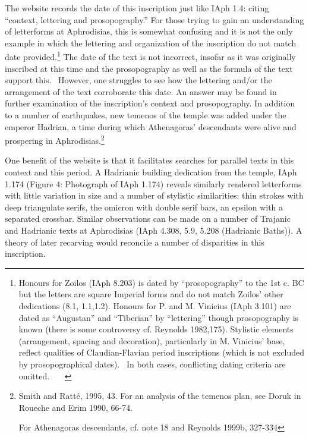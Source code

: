 \documentclass[amsthm,ebook]{saparticle}
\begin{document}
\bigskip

The website records the date of this inscription just like IAph 1.4: citing “context, lettering and prosopography.” For
those trying to gain an understanding of letterforms at Aphrodisias, this is somewhat confusing and it is not the only
example in which the lettering and organization of the inscription do not match date provided.\footnote{ Honours for
Zoilos (IAph 8.203) is dated by “prosopography” to the 1st c. BC but the letters are square Imperial forms and do not
match Zoilos’ other dedications (8.1, 1.1,1.2). Honours for P. and M. Vinicius (IAph 3.101) are dated as “Augustan” and
“Tiberian” by “lettering” though prosopography is known (there is some controversy cf. Reynolds 1982,175). Stylistic
elements (arrangement, spacing and decoration), particularly in M. Vinicius’ base, reflect qualities of
Claudian-Flavian period inscriptions (which is not excluded by prosopographical dates). \ In both cases, conflicting
dating criteria are omitted. \ \ \ } The date of the text is not incorrect, insofar as it was originally inscribed at
this time and the prosopography as well as the formula of the text support this. \ However, one struggles to see how
the lettering and/or the arrangement of the text corroborate this date. An answer may be found in further examination
of the inscription’s context and prosopography. In addition to a number of earthquakes, new temenos of the temple was
added under the emperor Hadrian, a time during which Athenagoras’ descendants were alive and prospering in
Aphrodisias.\footnote{ Smith and Ratté, 1995, 43. For an analysis of the temenos plan, see Doruk in Roueche and Erim
1990, 66-74. \par For Athenagoras descendants, cf. note 18 and Reynolds 1999b, 327-334} \ 


\bigskip

One benefit of the website is that it facilitates searches for parallel texts in this context and this period. A
Hadrianic building dedication from the temple, IAph 1.174 (Figure 4: Photograph of IAph 1.174) reveals similarly
rendered letterforms with little variation in size and a number of stylistic similarities: thin strokes with deep
triangulate serifs, the omicron with double serif bars, an epsilon with a separated crossbar. Similar observations can
be made on a number of Trajanic and Hadrianic texts at Aphrodisias (IAph 4.308, 5.9, 5.208 (Hadrianic Baths)). A theory
of later recarving would reconcile a number of disparities in this inscription. 
\end{document}
